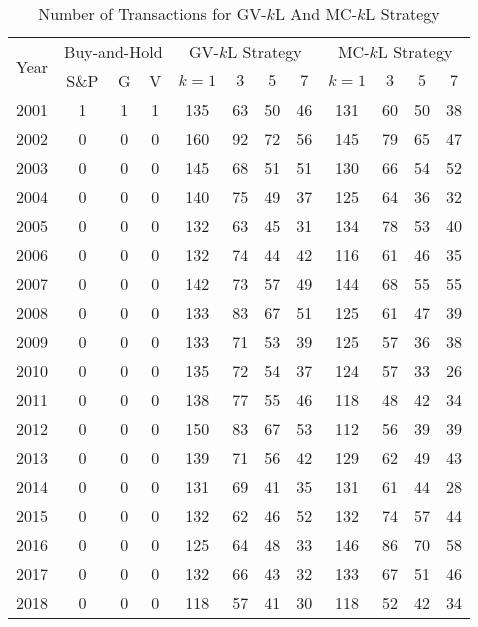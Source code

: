 \documentclass{article}
\begin{document}
\newpage
\begin{table}[!ht]
    \centering
    \caption{Number of Transactions for GV-$k$L And MC-$k$L Strategy}
\begin{tabular}{r| ccc|| cccc||cccc}
\hline
\multirow{2}{*}{Year} & \multicolumn{3}{c||}{Buy-and-Hold}   & \multicolumn{4}{c||}{GV-$k$L Strategy}& \multicolumn{4}{c}{MC-$k$L Strategy}\\ \cline{2-12}
  & S\&P & G & V  & $k=1$  & $3$  & $5$  & $7$  & $k=1$  & $3$  & $5$  & $7$ \\ 
\hline
        2001 & 1 & 1 & 1 & 135 & 63 & 50 & 46 & 131 & 60 & 50 & 38 \\ 
        2002 & 0 & 0 & 0 & 160 & 92 & 72 & 56 & 145 & 79 & 65 & 47 \\ 
        2003 & 0 & 0 & 0 & 145 & 68 & 51 & 51 & 130 & 66 & 54 & 52 \\ 
        2004 & 0 & 0 & 0 & 140 & 75 & 49 & 37 & 125 & 64 & 36 & 32 \\ 
        2005 & 0 & 0 & 0 & 132 & 63 & 45 & 31 & 134 & 78 & 53 & 40 \\ 
        2006 & 0 & 0 & 0 & 132 & 74 & 44 & 42 & 116 & 61 & 46 & 35 \\ 
        2007 & 0 & 0 & 0 & 142 & 73 & 57 & 49 & 144 & 68 & 55 & 55 \\ 
        2008 & 0 & 0 & 0 & 133 & 83 & 67 & 51 & 125 & 61 & 47 & 39 \\ 
        2009 & 0 & 0 & 0 & 133 & 71 & 53 & 39 & 125 & 57 & 36 & 38 \\ 
        2010 & 0 & 0 & 0 & 135 & 72 & 54 & 37 & 124 & 57 & 33 & 26 \\ 
        2011 & 0 & 0 & 0 & 138 & 77 & 55 & 46 & 118 & 48 & 42 & 34 \\ 
        2012 & 0 & 0 & 0 & 150 & 83 & 67 & 53 & 112 & 56 & 39 & 39 \\ 
        2013 & 0 & 0 & 0 & 139 & 71 & 56 & 42 & 129 & 62 & 49 & 43 \\ 
        2014 & 0 & 0 & 0 & 131 & 69 & 41 & 35 & 131 & 61 & 44 & 28 \\ 
        2015 & 0 & 0 & 0 & 132 & 62 & 46 & 52 & 132 & 74 & 57 & 44 \\ 
        2016 & 0 & 0 & 0 & 125 & 64 & 48 & 33 & 146 & 86 & 70 & 58 \\ 
        2017 & 0 & 0 & 0 & 132 & 66 & 43 & 32 & 133 & 67 & 51 & 46 \\ 
        2018 & 0 & 0 & 0 & 118 & 57 & 41 & 30 & 118 & 52 & 42 & 34 \\ 

\end{tabular}
\end{table}
\end{document}
